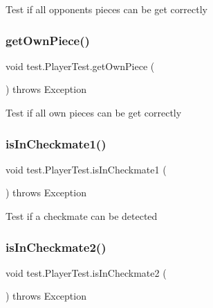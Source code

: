 Test if all opponent\textquotesingle{}s pieces can be get correctly \mbox{\label{classtest_1_1_player_test_a79edf065f06225fbd9d83323a2976b6c}} 
\subsubsection{\texorpdfstring{get\+Own\+Piece()}{getOwnPiece()}}
{\footnotesize\ttfamily void test.\+Player\+Test.\+get\+Own\+Piece (\begin{DoxyParamCaption}{ }\end{DoxyParamCaption}) throws Exception}

Test if all own pieces can be get correctly \mbox{\label{classtest_1_1_player_test_aad1ab6c518ab00c9bae07d229f07dd60}} 
\subsubsection{\texorpdfstring{is\+In\+Checkmate1()}{isInCheckmate1()}}
{\footnotesize\ttfamily void test.\+Player\+Test.\+is\+In\+Checkmate1 (\begin{DoxyParamCaption}{ }\end{DoxyParamCaption}) throws Exception}

Test if a checkmate can be detected \mbox{\label{classtest_1_1_player_test_ac2a028bc355f58cd35398bd0c948403f}} 
\subsubsection{\texorpdfstring{is\+In\+Checkmate2()}{isInCheckmate2()}}
{\footnotesize\ttfamily void test.\+Player\+Test.\+is\+In\+Checkmate2 (\begin{DoxyParamCaption}{ }\end{DoxyParamCaption}) throws Exception}

